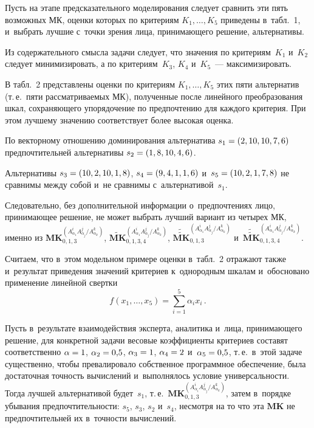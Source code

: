 \begin{multicols}{2}
   Пусть на этапе предсказательного моделирования следует сравнить эти пять 
возможных МК, оценки которых по критериям $K_1, \ldots , K_5$ приведены 
в~табл.~1, и~выбрать лучшие с~точки зрения лица, принимающего решение, 
альтернативы.
   

   
   Из содержательного смысла задачи следует, что значения по 
критериям~$K_1$ и~$K_2$ следует минимизировать, а по критериям~$K_3$, $K_4$ 
и~$K_5$~--- максимизировать.
   
   В табл.~2 представлены оценки по критериям $K_1,\ldots ,K_5$ этих пяти 
альтернатив (т.\,е.\ пяти рассматриваемых МК), полученные после линейного 
преобразования шкал, сохраняющего упорядочение по предпочтению для 
каждого критерия. При этом лучшему значению соответствует более высокая 
оценка.
   
    
  
   
   По векторному отношению доминирования альтернатива $s_1\hm= (2, 10, 10, 
7, 6)$ предпочтительней альтернативы $s_2\hm = (1, 8, 10, 4, 6)$.
   
   Альтернативы $s_3\hm = (10, 2, 10, 1, 8)$, $s_4\hm = (9, 4, 1, 1, 6)$ и~$s_5\hm = 
(10, 2, 1, 7, 8)$ не сравнимы между собой и~не сравнимы с~альтернативой~$s_1$.
   
   
   Следовательно, без дополнительной информации о~предпочтениях лицо, 
принимающее решение, не может выбрать лучший вариант из четырех МК, 
именно из 
$\mathbf{MK}_{0,1,3}^{(A^i_{\alpha_1}A^j_{\alpha_j}/A^k_{\alpha_k})}$,
   $\widetilde{\mathbf{MK}}_{0,1,3,4}^{(A^i_{\alpha_1}A^j_{\alpha_j}/ 
A^k_{\alpha_k})}$, 
$\widetilde{\widetilde{\mathbf{MK}}}_{0,1,3}^{(A^i_{\alpha_1}A^j_{\alpha_j}/A^k
_{\alpha_k})}$ 
и~$\widetilde{\widetilde{\mathbf{MK}}}_{0,1,3,4}^{(A^i_{\alpha_1}A^j_{\alpha_j}
/A^k_{\alpha_k})}$.
   
   Считаем, что в~этом модельном примере оценки в~табл.~2 отражают также 
и~результат приведения значений критериев к~однородным шкалам и~обосно\-ва\-но 
применение линейной свертки
   $$
   f(x_1,\ldots , x_5)=\sum\limits^5_{i=1} \alpha_i x_i\,.
   $$
   
   Пусть в~результате взаимодействия эксперта, аналитика и~лица, 
принимающего решение, для конкретной задачи весовые коэффициенты 
критериев составят соответственно
   $\alpha\hm=1$, $\alpha_2\hm=0{,}5$, $\alpha_3\hm=1$, 
   $\alpha_4\hm=2$ и~$\alpha_5\hm=0{,}5$,
т.\,е.\ в~этой задаче существенно, чтобы превалировало собственное программное 
обеспечение, была достаточная точ\-ность вы\-чис\-ле\-ний и~выполнялось условие 
уни\-вер\-саль\-ности. Тогда лучшей альтернативой будет~$s_1$, т.\,е.\  
$\mathbf{MK}_{0,1,3}^{(A^i_{\alpha_i}A^j_{\alpha_j}/A^k_{\alpha_k})}$, затем 
в~порядке убывания предпочтительности: $s_5$, $s_3$, $s_2$ и~$s_4$, не\-смот\-ря 
на то что эта $\mathbf{MK}$ не предпочтительней их в~точности вы\-чис\-ле\-ний.
   

\end{multicols}

